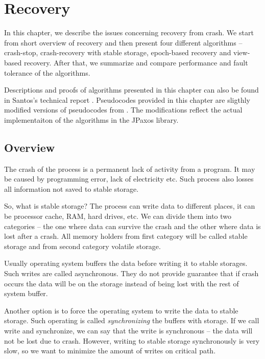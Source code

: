 \chapter{Recovery}
\label{chapter:recovery}

In this chapter, we describe the issues concerning recovery from crash. We start from short overview of recovery and then present four different algorithms -- crash-stop, crash-recovery with stable storage, epoch-based recovery and view-based recovery. \linebreak After that, we summarize and compare performance and fault tolerance of the algorithms. 

Descriptions and proofs of algorithms presented in this chapter can also be found in Santos's technical report \cite{Nun10}. Pseudocodes provided in this chapter are sligthly modified versions of pseudocodes from \cite{Nun10}. The modifications reflect the actual implementaiton of the algorithms in the JPaxos library.

\section{Overview}

The crash of the process is a permanent lack of activity from a program. It may be caused by programming error, lack of electricity etc. Such process also losses all information not saved to stable storage.

So, what is stable storage? The process can write data to different places, it can be processor cache, RAM, hard drives, etc. We can divide them into two categories -- the one where data can survive the crash and the other where data is lost after a crash. All memory holders from first category will be called stable storage and from second category volatile storage.

Usually operating system buffers the data before writing it to stable storages. Such writes are called asynchronous. They do not provide guarantee that if crash occurs the data will be on the storage instead of being lost with the rest of system buffer.

Another option is to force the operating system to write the data to stable storage. Such operating is called \emph{synchronizing} the buffers with storage. If we call write and synchronize, we can say that the write is synchronous -- the data will not be lost due to crash. However, writing to stable storage synchronously is very slow, so we want to minimize the amount of writes on critical path.

